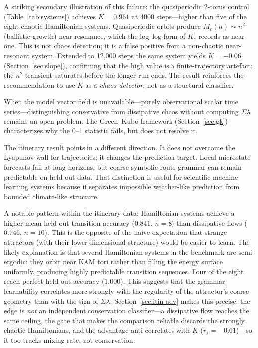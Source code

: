 \documentclass[11pt]{article}
\begin{document}
A striking secondary illustration of this failure: the quasiperiodic 2-torus
control (Table~\ref{tab:systems}) achieves $K=0.961$ at 4000 steps---higher than
five of the eight chaotic Hamiltonian systems. Quasiperiodic orbits produce
$M_c(n)\sim n^2$ (ballistic growth) near resonance, which the log--log form of
$K_c$ records as near-one. This is not chaos detection; it is a false positive
from a non-chaotic near-resonant system. Extended to 12,000 steps the same system
yields $K=-0.06$ (Section~\ref{sec:slope}), confirming that the high value is a
finite-trajectory artefact: the $n^2$ transient saturates before the longer
run ends. The result reinforces the recommendation to use $K$ as a \emph{chaos
detector}, not as a structural classifier.

When the model vector field is unavailable---purely observational scalar time
series---distinguishing conservative from dissipative chaos without computing
$\Sigma\lambda$ remains an open problem. The Green--Kubo framework (Section~\ref{sec:gk})
characterizes why the 0--1 statistic fails, but does not resolve it.

The itinerary result points in a different direction. It does not overcome the
Lyapunov wall for trajectories; it changes the prediction target. Local microstate
forecasts fail at long horizons, but coarse symbolic route grammar can remain
predictable on held-out data. That distinction is useful for scientific machine
learning systems because it separates impossible weather-like prediction from
bounded climate-like structure.

A notable pattern within the itinerary data: Hamiltonian systems achieve a higher
mean held-out transition accuracy ($0.841$, $n=8$) than dissipative flows ($0.746$,
$n=10$). This is the opposite of the naive expectation that strange attractors (with
their lower-dimensional structure) would be easier to learn. The likely explanation
is that several Hamiltonian systems in the benchmark are semi-ergodic: they orbit
near KAM tori rather than filling the energy surface uniformly, producing highly
predictable transition sequences. Four of the eight reach perfect held-out accuracy
($1.000$). This suggests that the grammar learnability correlates more strongly with
the regularity of the attractor's coarse geometry than with the sign of $\Sigma\lambda$.
Section~\ref{sec:itin-adv} makes this precise: the edge is \emph{not} an independent
conservation classifier---a dissipative flow reaches the same ceiling, the gate that
makes the comparison reliable discards the strongly chaotic Hamiltonians, and the
advantage anti-correlates with $K$ ($r_s=-0.61$)---so it too tracks mixing rate,
not conservation.
\end{document}
